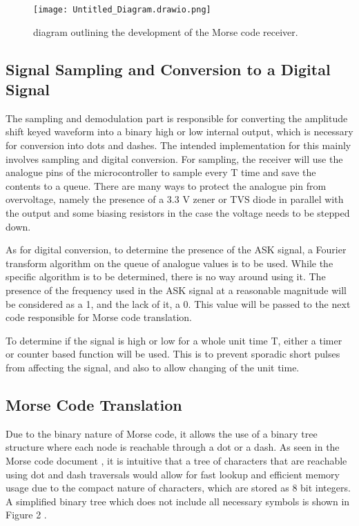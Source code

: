 \documentclass{cce2014-design}
\begin{document}
\begin{figure}[h]
    \centering
    \texttt{[image: Untitled\_Diagram.drawio.png]}
    \caption{diagram outlining the development of the Morse code receiver.}
    \label{fig:morse_tree}
\end{figure}

\subsection{Signal Sampling and Conversion to a Digital Signal}
The sampling and demodulation part is responsible for converting the amplitude shift keyed waveform into a binary high or low internal output, which is necessary for conversion into dots and dashes. The intended implementation for this mainly involves sampling and digital conversion. For sampling, the receiver will use the analogue pins of the microcontroller to sample every T time and save the contents to a queue. There are many ways to protect the analogue pin from overvoltage, namely the presence of a 3.3 V zener or TVS diode in parallel with the output and some biasing resistors in the case the voltage needs to be stepped down.

As for digital conversion, to determine the presence of the ASK signal, a Fourier transform algorithm on the queue of analogue values is to be used. While the specific algorithm is to be determined, there is no way around using it. The presence of the frequency used in the ASK signal at a reasonable magnitude will be considered as a 1, and the lack of it, a 0. This value will be passed to the next code responsible for Morse code translation.

To determine if the signal is high or low for a whole unit time T, either a timer or counter based function will be used. This is to prevent sporadic short pulses from affecting the signal, and also to allow changing of the unit time.
\subsection{Morse Code Translation}

Due to the binary nature of Morse code, it allows the use of a binary tree structure where each node is reachable through a dot or a dash. As seen in the Morse code document \cite{itu2009}, it is intuitive that a tree of characters that are reachable using dot and dash traversals would allow for fast lookup and efficient memory usage due to the compact nature of characters, which are stored as 8 bit integers. A simplified binary tree which does not include all necessary symbols is shown in Figure 2 \cite{morsecode-tree}.
\end{document}
